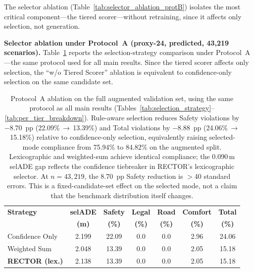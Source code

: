 The selector ablation (Table~\ref{tab:selector_ablation_protB}) isolates the most critical component---the tiered scorer---without retraining, since it affects only selection, not generation.

\noindent\textbf{Selector ablation under Protocol~A (proxy-24, predicted, 43{,}219 scenarios).}
Table~\ref{tab:selector_ablation_protA} reports the selection-strategy comparison under Protocol~A---the same protocol used for all main results.  Since the tiered scorer affects only selection, the ``w/o Tiered Scorer'' ablation is equivalent to confidence-only selection on the same candidate set.

\begin{table}[t]
\centering
\caption{Selector Ablation under Protocol~A (Proxy-24, Predicted, 43{,}219 Scenarios, Current Checkpoint)}
\label{tab:selector_ablation_protA}
\setlength{\tabcolsep}{3pt}
\begin{tabular}{lcccccc}
\toprule
\textbf{Strategy} & \textbf{selADE} & \textbf{Safety} & \textbf{Legal} & \textbf{Road} & \textbf{Comfort} & \textbf{Total} \\
 & \textbf{(m)} & \textbf{(\%)} & \textbf{(\%)} & \textbf{(\%)} & \textbf{(\%)} & \textbf{(\%)} \\
\midrule
Confidence Only & 2.199 & 22.09 & 0.0 & 0.0 & 2.96 & 24.06 \\
Weighted Sum & 2.048 & 13.39 & 0.0 & 0.0 & 2.05 & 15.18 \\
\textbf{RECTOR (lex.)} & 2.138 & 13.39 & 0.0 & 0.0 & 2.05 & 15.18 \\
\bottomrule
\end{tabular}
\vspace{1mm}
\caption*{\footnotesize Protocol~A ablation on the full augmented validation set, using the same protocol as all main results (Tables~\ref{tab:selection_strategy}--\ref{tab:per_tier_breakdown}).  Rule-aware selection reduces Safety violations by $-$8.70~pp (22.09\%\,$\to$\,13.39\%) and Total violations by $-$8.88~pp (24.06\%\,$\to$\,15.18\%) relative to confidence-only selection, equivalently raising selected-mode compliance from 75.94\% to 84.82\% on the augmented split.  Lexicographic and weighted-sum achieve identical compliance; the 0.090\,m selADE gap reflects the confidence tiebreaker in RECTOR's lexicographic selector.  At $n{=}43{,}219$, the 8.70~pp Safety reduction is $>$40 standard errors.  This is a fixed-candidate-set effect on the selected mode, not a claim that the benchmark distribution itself changes.}
\end{table}

